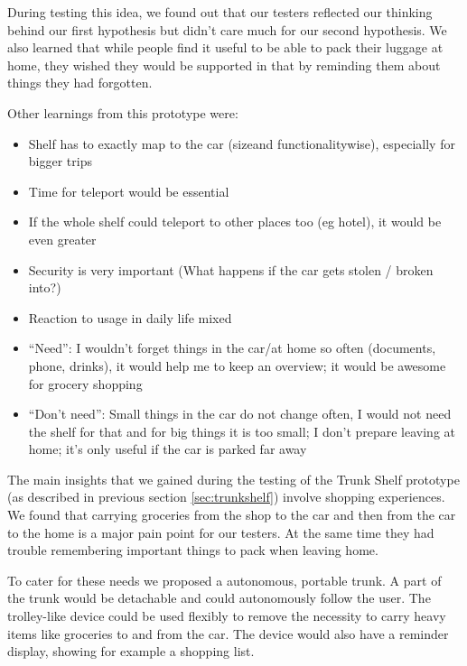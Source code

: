 
During testing this idea, we found out that our testers reflected our thinking behind our first hypothesis but didn't care much for our second hypothesis. We also learned that while people find it useful to be able to pack their luggage at home, they wished they would be supported in that by reminding them about things they had forgotten.

Other learnings from this prototype were:

\begin{itemize}
    \item Shelf has to exactly map to the car (size­and functionality­wise), especially for bigger trips
    \item Time for teleport would be essential
    \item If the whole shelf could teleport to other places too (eg hotel), it would be even greater
    \item Security is very important (What happens if the car gets stolen / broken into?)
    \item Reaction to usage in daily life mixed
    \item ``Need'': I wouldn’t forget things in the car/at home so often (documents, phone, drinks), it would help me to keep an overview; it would be awesome for grocery shopping
    \item ``Don't need'': Small things in the car do not change often, I would not need the shelf for that and for big things it is too small; I don’t prepare leaving at home; it’s only useful if the car is parked far away
\end{itemize}


The main insights that we gained during the testing of the Trunk Shelf prototype (as described in previous section \ref{sec:trunkshelf}) involve shopping experiences. We found that carrying groceries from the shop to the car and then from the car to the home is a major pain point for our testers. At the same time they had trouble remembering important things to pack when leaving home.

To cater for these needs we proposed a autonomous, portable trunk. A part of the trunk would be detachable and could autonomously follow the user. The trolley-like device could be used flexibly to remove the necessity to carry heavy items like groceries to and from the car. The device would also have a reminder display, showing for example a shopping list.

